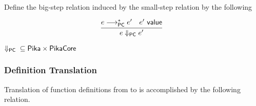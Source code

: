 \[\begin{array}{c}
  \end{array}
\]

Define the big-step relation induced by the small-step relation by the following

\[
  \begin{array}{c}
    \labinfer{e \pcStep e'}
      {e \pcsteps e' & e' ~\val}
  \end{array}
\]

\begin{theorem} $\Downarrow_{\textsf{PC}}{} \subseteq \textsf{Pika} \times \textsf{PikaCore}$
\end{theorem}

\subsubsection{Definition Translation}

Translation of function definitions from \Pika{} to \PikaCore{} is accomplished by the following relation.

